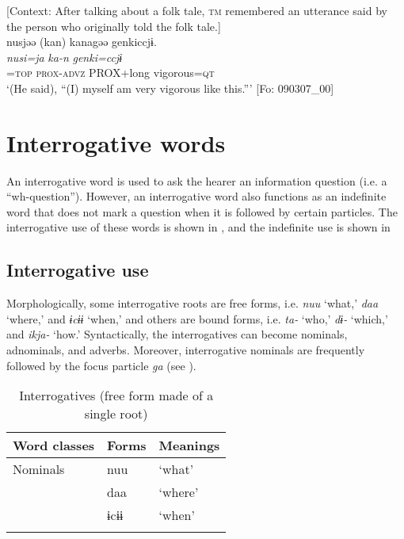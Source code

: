\ea \label{ex:5:30}   [Context: After talking about a folk tale, \textsc{tm} remembered an utterance said by the person who originally told the folk tale.]\\
\glll  nusjəə  (kan)  kanagəə  {\textbar}genki{\textbar}ccjɨ.\\
\textit{nusi=ja}  \textit{ka-n}  \textit{}  \textit{genki=ccjɨ}\\
\REF=\textsc{top}  \textsc{prox}-\textsc{advz}  PROX+long  vigorous=\textsc{qt}\\
\glt ‘(He said), “(I) myself am very vigorous like this.”’ [Fo: 090307\_00]
\z

\section{Interrogative words}
\label{sec:key:5.3}
An interrogative word is used to ask the hearer an information question (i.e. a “wh-question”). However, an interrogative word also functions as an indefinite word that does not mark a question when it is followed by certain particles. The interrogative use of these words is shown in , and the indefinite use is shown in 

\subsection{Interrogative use}

Morphologically, some interrogative roots are free forms, i.e. \textit{nuu} ‘what,’ \textit{daa} ‘where,’ and \textit{ɨcɨɨ} ‘when,’ and others are bound forms, i.e. \textit{ta-} ‘who,’ \textit{dɨ-} ‘which,’ and \textit{ikja-} ‘how.’ Syntactically, the interrogatives can become nominals, adnominals, and adverbs. Moreover, interrogative nominals are frequently followed by the focus particle \textit{ga} (see ).

\begin{table}
\caption{\label{tab:key:38}Interrogatives (free form made of a single root)}
\begin{tabular}{lll}
Word classes  &  Forms & Meanings\\\midrule
Nominals  &  nuu  & ‘what’\\
          &  daa  & ‘where’\\
          &  ɨcɨɨ & ‘when’\\
\lspbottomrule
\end{tabular}
\end{table}

